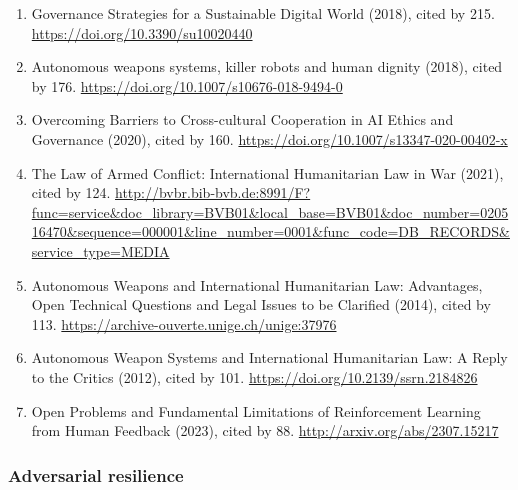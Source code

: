 \documentclass[
]{article}
\begin{document}
\begin{enumerate}
\item
  Governance Strategies for a Sustainable Digital World (2018), cited by
  215. \url{https://doi.org/10.3390/su10020440}
\item
  Autonomous weapons systems, killer robots and human dignity (2018),
  cited by 176. \url{https://doi.org/10.1007/s10676-018-9494-0}
\item
  Overcoming Barriers to Cross-cultural Cooperation in AI Ethics and
  Governance (2020), cited by 160.
  \url{https://doi.org/10.1007/s13347-020-00402-x}
\item
  The Law of Armed Conflict: International Humanitarian Law in War
  (2021), cited by 124.
  \url{http://bvbr.bib-bvb.de:8991/F?func=service\&doc_library=BVB01\&local_base=BVB01\&doc_number=020516470\&sequence=000001\&line_number=0001\&func_code=DB_RECORDS\&service_type=MEDIA}
\item
  Autonomous Weapons and International Humanitarian Law: Advantages,
  Open Technical Questions and Legal Issues to be Clarified (2014),
  cited by 113. \url{https://archive-ouverte.unige.ch/unige:37976}
\item
  Autonomous Weapon Systems and International Humanitarian Law: A Reply
  to the Critics (2012), cited by 101.
  \url{https://doi.org/10.2139/ssrn.2184826}
\item
  Open Problems and Fundamental Limitations of Reinforcement Learning
  from Human Feedback (2023), cited by 88.
  \url{http://arxiv.org/abs/2307.15217}
\end{enumerate}

\hypertarget{adversarial-resilience}{%
\subsubsection{Adversarial resilience}\label{adversarial-resilience}}
\end{document}
